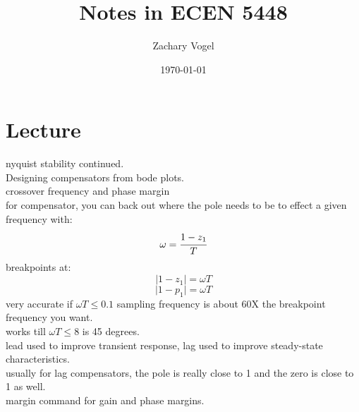 \documentclass{article}
\author{Zachary Vogel}
\date{\today}
\title{Notes in ECEN 5448}
\begin{document}
\maketitle


\section*{Lecture}
nyquist stability continued.\\

Designing compensators from bode plots.\\
crossover frequency and phase margin\\

for compensator, you can back out where the pole needs to be to effect a given frequency with:
\[\omega=\cfrac{1-z_1}{T}\]
breakpoints at:
\[\lvert 1-z_1\rvert=\omega T\]
\[\lvert 1-p_1\rvert=\omega T\]
very accurate if $\omega T\leq 0.1$ sampling frequency is about 60X the breakpoint frequency you want.\\
works till $\omega T\leq 8$ is 45 degrees.\\

lead used to improve transient response, lag used to improve steady-state characteristics.\\

usually for lag compensators, the pole is really close to 1 and the zero is close to 1 as well.\\

margin command for gain and phase margins.\\
\end{document}
